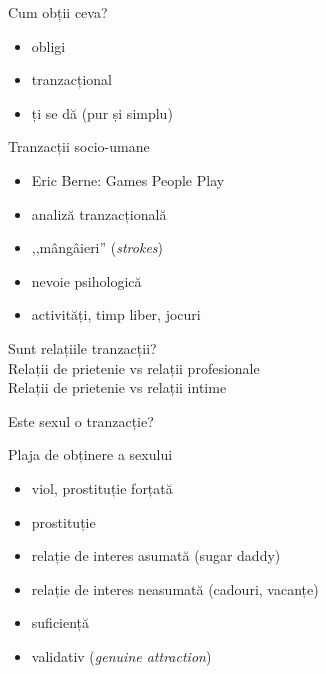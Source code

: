 \documentclass{simple}
\begin{document}
\begin{frame}{Cum obții ceva?}
  \begin{itemize}
    \pause
    \item obligi
    \pause
    \item tranzacțional
    \pause
    \item ți se dă (pur și simplu)
  \end{itemize}
\end{frame}

\begin{frame}{Tranzacții socio-umane}
  \begin{itemize}
    \pause
    \item Eric Berne: Games People Play
    \pause
    \item analiză tranzacțională
    \pause
    \item ,,mângâieri'' (\textit{strokes})
    \pause
    \item nevoie psihologică
    \pause
    \item activități, timp liber, jocuri
  \end{itemize}
\end{frame}

\begin{frame}{}
  \centering
  \pause
  \vspace{0.5cm}
  \Large{Sunt relațiile tranzacții?} \\
  \pause
  \vspace{0.5cm}
  \Large{Relații de prietenie vs relații profesionale} \\
  \pause
  \vspace{0.5cm}
  \Large{Relații de prietenie vs relații intime} \\
\end{frame}

\begin{frame}{}
  \centering
  \pause
  \vspace{0.5cm}
  \Large{Este sexul o tranzacție?} \\
\end{frame}

\begin{frame}{Plaja de obținere a sexului}
  \begin{itemize}
    \pause
    \item viol, prostituție forțată
    \pause
    \item prostituție
    \pause
    \item relație de interes asumată (sugar daddy)
    \pause
    \item relație de interes neasumată (cadouri, vacanțe)
    \pause
    \item suficiență
    \pause
    \item validativ (\textit{genuine attraction})
  \end{itemize}
\end{frame}
\end{document}
